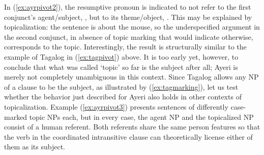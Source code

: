 In (\ref{ex:ayrpivot2}), the resumptive pronoun is indicated to not refer to
the first conjunct's agent/subject, , but to its
theme/object, . This may be explained by topicalization:
the sentence is about the mouse, so the underspecified argument in the second
conjunct, in absence of topic marking that would indicate otherwise,
corresponds to the topic. Interestingly, the result is structurally similar to
the example of Tagalog in (\ref{ex:tagpivot}) above. It is too early yet,
however, to conclude that what was called `topic' so far is the subject after
all; Ayeri is merely not completely unambiguous in this context. Since Tagalog
allows any NP of a clause to be the subject, as illustrated by
(\ref{ex:tagmarking}), let us test whether the behavior just described for
Ayeri also holds in other contexts of topicalization. Example 
(\ref{ex:ayrpivot3}) presents sentences of differently case-marked topic NPs
each, but in every case, the agent NP and the topicalized NP consist of a human
referent. Both referents share the same person features so that the verb in the
coordinated intransitive clause can theoretically license either of them as its
subject.

